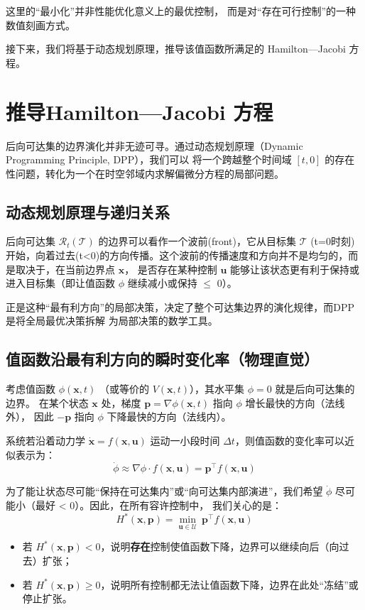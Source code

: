 \documentclass[11pt]{ctexrep}
\begin{document}
这里的“最小化”并非性能优化意义上的最优控制，
而是对“存在可行控制”的一种数值刻画方式。

接下来，我们将基于动态规划原理，推导该值函数所满足的 Hamilton---Jacobi 方程。

\vspace{5ex}

\section{推导Hamilton---Jacobi 方程}
后向可达集的边界演化并非无迹可寻。通过动态规划原理（Dynamic Programming Principle, DPP），我们可以
将一个跨越整个时间域 $[t,0]$ 的存在性问题，转化为一个在时空邻域内求解偏微分方程的局部问题。
\subsection{动态规划原理与递归关系}

后向可达集 $\mathcal{R}_t(\mathcal{T})$ 的边界可以看作一个波前(front)，它从目标集 $\mathcal{T}$ (t=0时刻)
开始，向着过去(t<0)的方向传播。这个波前的传播速度和方向并不是均匀的，而是取决于，在当前边界点 $\mathbf{x}$，
是否存在某种控制 $\mathbf{u}$ 能够让该状态更有利于保持或进入目标集（即让值函数 $\phi$ 继续减小或保持 $\le$ 0）。

正是这种“最有利方向”的局部决策，决定了整个可达集边界的演化规律，而DPP是将全局最优决策拆解
为局部决策的数学工具。

\subsection{值函数沿最有利方向的瞬时变化率（物理直觉）}

考虑值函数 $\phi(\mathbf{x},t)$ （或等价的 $V(\mathbf{x},t)$），其水平集 $\phi = 0$ 就是后向可达集的边界。
在某个状态 $\mathbf{x}$ 处，梯度 $\mathbf{p} = \nabla \phi (\mathbf{x},t)$ 指向 $\phi$ 增长最快的方向（法线外），
因此 $-\mathbf{p}$ 指向 $\phi$ 下降最快的方向（法线内）。

系统若沿着动力学 $\dot{\mathbf{x}} = f(\mathbf{x},\mathbf{u})$ 运动一小段时间 $\Delta t$，则值函数的变化率可以近似表示为：
\begin{equation}
    \dot{\phi} \approx \nabla \phi \cdot f(\mathbf{x},\mathbf{u}) = \mathbf{p}^\top f(\mathbf{x},\mathbf{u})
\end{equation}

为了能让状态尽可能“保持在可达集内”或“向可达集内部演进”，我们希望 $\dot{\phi}$ 尽可能小（最好 < 0）。因此，在所有容许控制中，
我们关心的是：
\begin{equation}
    \boxed{
        H^*(\mathbf{x},\mathbf{p}) = \min_{\mathbf{u} \in \mathcal{U}} \ \mathbf{p}^\top f(\mathbf{x},\mathbf{u})
    }
\end{equation}
\begin{itemize}
 \item 若 $H^*(\mathbf{x},\mathbf{p}) < 0$，说明\textbf{存在}控制使值函数下降，边界可以继续向后（向过去）扩张；
 \item 若 $H^*(\mathbf{x},\mathbf{p}) \ge 0$，说明所有控制都无法让值函数下降，边界在此处“冻结”或停止扩张。
\end{itemize}
\end{document}
